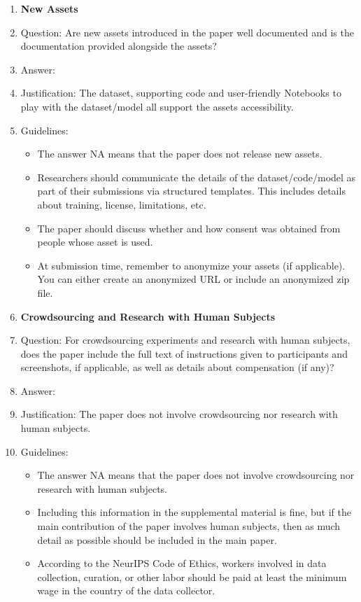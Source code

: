 \documentclass{article}
\begin{document}
\begin{enumerate}
\item {\bf New Assets}
    \item[] Question: Are new assets introduced in the paper well documented and is the documentation provided alongside the assets?
    \item[] Answer: \answerYes{} %
    \item[] Justification: The dataset, supporting code and user-friendly Notebooks to play with the dataset/model all support the assets accessibility. 
    \item[] Guidelines:
    \begin{itemize}
        \item The answer NA means that the paper does not release new assets.
        \item Researchers should communicate the details of the dataset/code/model as part of their submissions via structured templates. This includes details about training, license, limitations, etc. 
        \item The paper should discuss whether and how consent was obtained from people whose asset is used.
        \item At submission time, remember to anonymize your assets (if applicable). You can either create an anonymized URL or include an anonymized zip file.
    \end{itemize}

\item {\bf Crowdsourcing and Research with Human Subjects}
    \item[] Question: For crowdsourcing experiments and research with human subjects, does the paper include the full text of instructions given to participants and screenshots, if applicable, as well as details about compensation (if any)? 
    \item[] Answer: \answerNA{} %
    \item[] Justification: The paper does not involve crowdsourcing nor research with human subjects. 
    \item[] Guidelines:
    \begin{itemize}
        \item The answer NA means that the paper does not involve crowdsourcing nor research with human subjects.
        \item Including this information in the supplemental material is fine, but if the main contribution of the paper involves human subjects, then as much detail as possible should be included in the main paper. 
        \item According to the NeurIPS Code of Ethics, workers involved in data collection, curation, or other labor should be paid at least the minimum wage in the country of the data collector. 
    \end{itemize}


\end{enumerate}
\end{document}
